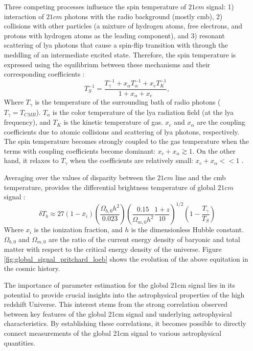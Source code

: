 \documentclass[%
 reprint,
 amsmath,amssymb,
 aps,
]{revtex4-2}
\begin{document}
Three competing processes influence the spin temperature of $21cm$ signal: 1) interaction of $21cm$ photons with the radio background (mostly \gls{cmb}), 2) collisions with other particles (a mixture of hydrogen atoms, free electrons, and protons with hydrogen atoms as the leading component), and 3) resonant scattering of \gls{lya} photons that cause a spin-flip transition with through the meddling of an intermediate excited state. Therefore, the spin temperature is expressed using the equilibrium between these mechanisms and their corresponding coefficients \cite{low_frequency,21century}:
\begin{equation}
    T^{-1}_S = \frac{T^{-1}_\gamma + x_\alpha T^{-1}_\alpha + x_c T^{-1}_K}{1 + x_\alpha + x_c},
\end{equation}
Where $T_\gamma$ is the temperature of the surrounding bath of radio photons ($T_\gamma = T_{CMB}$). $T_\alpha$ is the color temperature of the \gls{lya} radiation field (at the \gls{lya} frequency), and $T_K$ is the kinetic temperature of gas. $x_c$ and $x_\alpha$ are the coupling coefficients due to atomic collisions and scattering of \gls{lya} photons, respectively. The spin temperature becomes strongly coupled to the gas temperature when the terms with coupling coefficients become dominant: $x_c + x_\alpha \gtrsim 1$. On the other hand, it relaxes to $T_\gamma$ when the coefficients are relatively small: $x_c + x_\alpha << 1$ \cite{21century, low_frequency}. \par
Averaging over the values of disparity between the $21cm$ line and the \gls{cmb} temperature, provides the differential brightness temperature of global $21cm$ signal \cite{low_frequency}:
\begin{equation}
    \delta T_b \approx 27 \left(1- \bar{x}_i\right) \left(\frac{\Omega_{b, 0}h^2}{0.023}\right) \left( \frac{0.15}{\Omega_{m, 0}h^2} \frac{1+z}{10}\right)^{1/2}\left(1-\frac{T_\gamma}{T_S}\right)
    \label{eq:global_curve}
\end{equation}
Where $x_i$ is the ionization fraction, and $h$ is the dimensionless Hubble constant. $\Omega_{b, 0}$ and $\Omega_{m, 0}$ are the ratio of the current energy density of baryonic and total matter with respect to the critical energy density of the universe. Figure \ref{fig:global_signal_pritchard_loeb} shows the evolution of the above equitation in the cosmic history.\par
The importance of parameter estimation for the global 21cm signal lies in its potential to provide crucial insights into the astrophysical properties of the high redshift Universe. This interest stems from the strong correlation observed between key features of the global 21cm signal and underlying astrophysical characteristics. By establishing these correlations, it becomes possible to directly connect measurements of the global 21cm signal to various astrophysical quantities.
\end{document}
